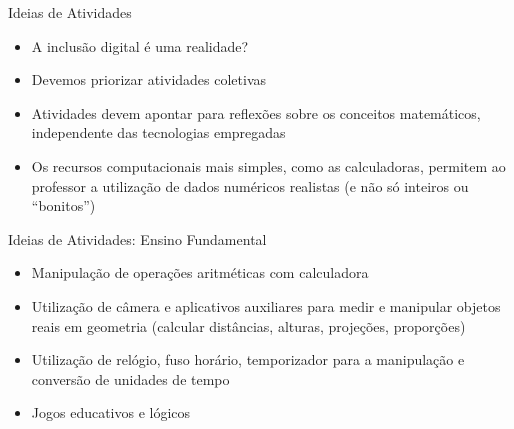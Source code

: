 \documentclass[10pt,]{beamer}
\begin{document}



\begin{frame}{Ideias de Atividades}
  \begin{itemize}
    \item A inclusão digital é uma realidade?
    \item Devemos priorizar atividades coletivas
    \item Atividades devem apontar para reflexões sobre os conceitos matemáticos, independente das tecnologias empregadas
    \item Os recursos computacionais mais simples, como as calculadoras, permitem ao professor a utilização de dados numéricos realistas (e não só inteiros ou ``bonitos'') 
  \end{itemize}
\end{frame}

\begin{frame}{Ideias de Atividades: Ensino Fundamental}
  \begin{itemize}
  \item Manipulação de operações aritméticas com calculadora
  \item Utilização de câmera e aplicativos auxiliares para medir e manipular objetos reais em geometria (calcular distâncias, alturas, projeções, proporções)
  \item Utilização de relógio, fuso horário, temporizador para a manipulação e conversão de unidades de tempo
  \item Jogos educativos e lógicos
  \end{itemize}
\end{frame}
\end{document}
